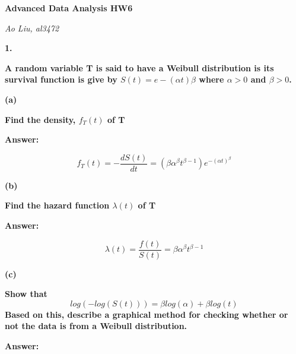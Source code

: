 \documentclass[letterpaper,11pt]{article}
\begin{document}
\begin{center}
	\textbf{\Huge{Advanced Data Analysis HW6}}
\end{center}

\begin{center}
	\textsl{Ao Liu, al3472}
\end{center}

\bigbreak
\bigbreak
\bigbreak



\begin{addmargin}[-2em]{0em}
  \large{\textbf{1. }}
\end{addmargin}
\textbf{A random variable T is said to have a Weibull distribution is its survival function is give by $S(t) = e−(\alpha t)\beta$ where $\alpha > 0$ and $\beta > 0$.}

\begin{addmargin}[-1.1em]{0em}
  \textbf{(a)}\par
\end{addmargin}
\textbf{Find the density, $f_T (t)$ of T}\par
\bigbreak
\begin{addmargin}[-0.5em]{0em}
  \textbf{Answer: }
\end{addmargin}

$$f_T(t) = -\frac{dS(t)}{dt} = (\beta\alpha^{\beta}t^{\beta-1})e^{-(\alpha t)^{\beta}}$$



\begin{addmargin}[-1.1em]{0em}
  \textbf{(b)}\par
\end{addmargin}
\textbf{Find the hazard function $\lambda(t)$ of T}\par
\bigbreak
\begin{addmargin}[-0.5em]{0em}
  \textbf{Answer: }
\end{addmargin}

$$\lambda(t) = \frac{f(t)}{S(t)} = \beta\alpha^{\beta}t^{\beta-1}$$


\begin{addmargin}[-1.1em]{0em}
  \textbf{(c)}\par
\end{addmargin}
\textbf{Show that}
$$log(-log(S(t))) = \beta log(\alpha) + \beta log(t)$$
\textbf{Based on this, describe a graphical method for checking whether or not the data is
from a Weibull distribution.}\par
\bigbreak
\begin{addmargin}[-0.5em]{0em}
  \textbf{Answer: }
\end{addmargin}
\end{document}

